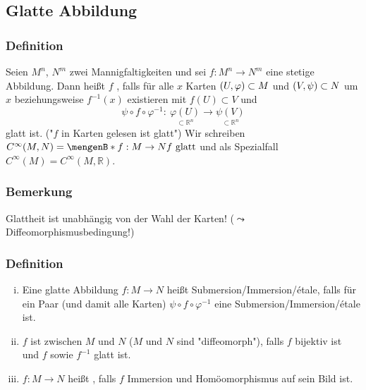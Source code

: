 
\subsection{Glatte Abbildung}
\label{sub:13}

\subsubsection[Definition: Glatte Funktionen zwischen zwei Mannigfaltigkeiten]{Definition}
\label{ssub:117}

Seien $M^n$, $N^m$ zwei Mannigfaltigkeiten und sei $f:M^n\to N^m$ eine stetige Abbildung. Dann heißt $f$ , falls für alle $x$ Karten $(U,\varphi) \subset M$ und $(V,\psi) \subset N$ um $x$ beziehungsweise $f^{-1}(x)$ existieren mit $f(U)\subset V$ und 
\[
	\psi \circ f \circ \varphi^{-1}:\ \underset{\subset \mathds{R}^n}{\varphi(U)} \to \underset{\subset \mathds{R}^n}{\psi(V)}
\]
glatt ist. ("$f$ in Karten gelesen ist glatt")
Wir schreiben $C^{\infty}(M,N) = \set[f:M\to N]{f\ \text{glatt}}$ und als Spezialfall $C^{\infty}(M) = C^{\infty}(M,\mathds{R})$.

\subsubsection[Bemerkung: Glattheit unabhängig von der Wahl der Karten]{Bemerkung}
\label{ssub:118}
Glattheit ist unabhängig von der Wahl der Karten! ($\leadsto$ Diffeomorphismusbedingung!)

\subsubsection[Definition: Submersion/Immersion/étale, Diffeomorphismus und Einbettung]{Definition}
\label{ssub:119}
\begin{enumerate}[(i)]
\item Eine glatte Abbildung $f:M\to N$ heißt Submersion/Immersion/étale, falls für ein Paar (und damit alle Karten) $\psi \circ f \circ \varphi^{-1}$ eine Submersion/Immersion/étale ist.
\item $f$ ist  zwischen $M$ und $N$ ($M$ und $N$ sind "diffeomorph"), falls $f$ bijektiv ist und $f$ sowie $f^{-1}$ glatt ist.
\item $f:M\to N$ heißt , falls $f$ Immersion und Homöomorphismus auf sein Bild ist.
\end{enumerate}

